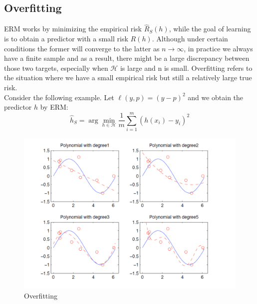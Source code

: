 \subsection{Overfitting}
ERM works by minimizing the empirical risk $\hat{R}_S(h)$, while the goal of learning is to obtain a predictor with
a small risk $R(h)$. Although under certain conditions the former will converge to the latter as $n \rightarrow \infty$,
in practice we always have a finite sample and as a result, there might be a large discrepancy between those
two targets, especially when $\mathcal{H}$ is large and n is small. Overfitting refers to the situation where we have a
small empirical risk but still a relatively large true risk.\\
Consider the following example. Let $\ell(y, p)=(y-p)^2$ and we obtain the predictor $h$ by ERM:
\begin{equation}
\hat{h}_S = \arg\min_{h \in \mathcal{H}} \frac{1}{m} \sum_{i=1}^{m}{(h(x_i)-y_i)^2}
\end{equation}
\begin{figure}[htbp]
	\centering
	\includegraphics[width=1.1\linewidth]{6DL/figures/overfitting.png}
	\caption{Overfitting}
	\label{Overfitting1}
\end{figure}

